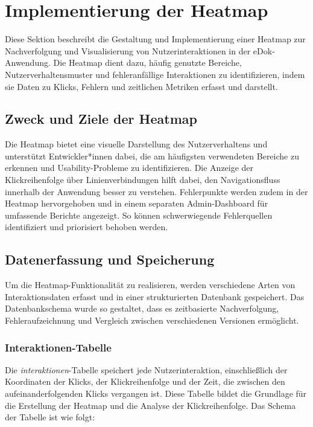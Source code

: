 \documentclass[12pt,oneside]{article}
\begin{document}
\section{Implementierung der Heatmap}
Diese Sektion beschreibt die Gestaltung und Implementierung einer Heatmap zur Nachverfolgung und Visualisierung von Nutzerinteraktionen in der eDok-Anwendung. Die Heatmap dient dazu, häufig genutzte Bereiche, Nutzerverhaltensmuster und fehleranfällige Interaktionen zu identifizieren, indem sie Daten zu Klicks, Fehlern und zeitlichen Metriken erfasst und darstellt.

\subsection{Zweck und Ziele der Heatmap}
Die Heatmap bietet eine visuelle Darstellung des Nutzerverhaltens und unterstützt Entwickler*innen dabei, die am häufigsten verwendeten Bereiche zu erkennen und Usability-Probleme zu identifizieren. Die Anzeige der Klickreihenfolge über Linienverbindungen hilft dabei, den Navigationsfluss innerhalb der Anwendung besser zu verstehen. Fehlerpunkte werden zudem in der Heatmap hervorgehoben und in einem separaten Admin-Dashboard für umfassende Berichte angezeigt. So können schwerwiegende Fehlerquellen identifiziert und priorisiert behoben werden.

\subsection{Datenerfassung und Speicherung}
Um die Heatmap-Funktionalität zu realisieren, werden verschiedene Arten von Interaktionsdaten erfasst und in einer strukturierten Datenbank gespeichert. Das Datenbankschema wurde so gestaltet, dass es zeitbasierte Nachverfolgung, Fehleraufzeichnung und Vergleich zwischen verschiedenen Versionen ermöglicht.

\subsubsection{Interaktionen-Tabelle}
Die \textit{interaktionen}-Tabelle speichert jede Nutzerinteraktion, einschließlich der Koordinaten der Klicks, der Klickreihenfolge und der Zeit, die zwischen den aufeinanderfolgenden Klicks vergangen ist. Diese Tabelle bildet die Grundlage für die Erstellung der Heatmap und die Analyse der Klickreihenfolge. Das Schema der Tabelle ist wie folgt:
\end{document}
